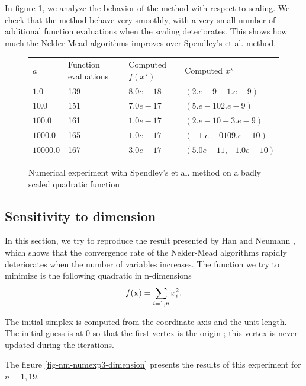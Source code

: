 In figure \ref{fig-nm-numexp2-scaling}, we analyze the 
behavior of the method with respect to scaling.
We check that the method behave very smoothly, with a very 
small number of additional function evaluations when the 
scaling deteriorates. This shows how much the Nelder-Mead algorithms 
improves over Spendley's et al. method.

\begin{figure}[htbp]
\begin{center}
\begin{tabular}{|l|l|l|l|}
\hline
$a$ & Function evaluations & Computed $f(x^\star)$ & Computed $x^\star$\\
$1.0$ & 139 & $8.0e-18$ & $(2.e-9 -1.e-9)$\\
$10.0$ & 151 & $7.0e-17$ & $(5.e-10 2.e-9)$\\
$100.0$ & 161 & $1.0e-17$ & $(2.e-10 -3.e-9)$ \\
$1000.0$ & 165 & $1.0e-17$ & $(-1.e-010 9.e-10)$\\
$10000.0$ & 167 & $3.0e-17$ & $(5.0e-11,-1.0e-10)$ \\
\hline
\end{tabular}
\end{center}
\caption{Numerical experiment with Spendley's et al. method on a badly scaled quadratic function}
\label{fig-nm-numexp2-scaling}
\end{figure}

\subsection{Sensitivity to dimension}

In this section, we try to reproduce the result 
presented by Han and Neumann \cite{HanNeumann2006}, which shows that the 
convergence rate of the Nelder-Mead algorithms rapidly 
deteriorates when the number of variables increases.
The function we try to minimize is the following quadratic 
in n-dimensions 
\begin{eqnarray}
\label{quadratic-function3}
f(\bold{x}) = \sum_{i=1,n} x_i^2.
\end{eqnarray}

The initial simplex is computed from the coordinate axis and the unit length.
The initial guess is at 0 so that the first vertex is the origin ; 
this vertex is never updated during the iterations.

The figure \ref{fig-nm-numexp3-dimension} presents the results of this 
experiment for $n=1,19$. 


